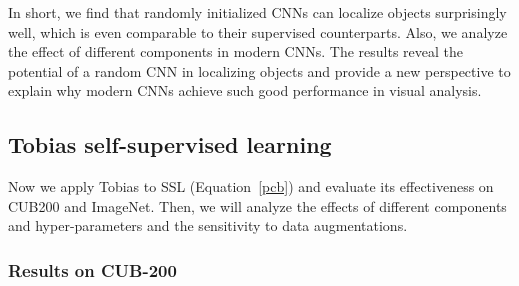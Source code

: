 \documentclass[letterpaper]{article}
\begin{document}
In short, we find that randomly initialized CNNs can localize objects surprisingly well, which is even comparable to their supervised counterparts. Also, we analyze the effect of different components in modern CNNs. The results reveal the potential of a random CNN in localizing objects and provide a new perspective to explain why modern CNNs achieve such good performance in visual analysis.


\subsection{Tobias self-supervised learning} \label{sec:exp2}

Now we apply Tobias to SSL (Equation~\ref{pcb}) and evaluate its effectiveness on CUB200 and ImageNet. Then, we will analyze the effects of different components and hyper-parameters and the sensitivity to data augmentations.

\subsubsection{Results on CUB-200} \label{sec:cub}
\end{document}
